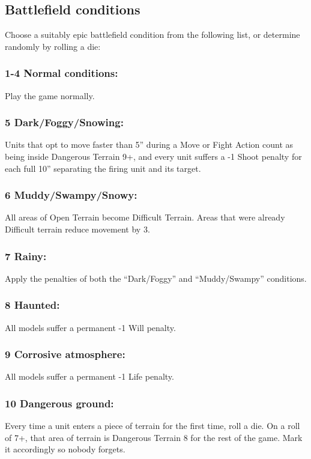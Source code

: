 \begin{multicols}{2}
\section*{Battlefield conditions}
Choose a suitably epic battlefield condition from the following list, or determine randomly by rolling a die:

\subsubsection*{1-4 Normal conditions:} Play the game normally.

\subsubsection*{5 Dark/Foggy/Snowing:} Units that opt to move faster than 5'' during a Move or Fight Action count as being inside Dangerous Terrain 9+, and every unit suffers a -1 Shoot penalty for each full 10'' separating the firing unit and its target.

\subsubsection*{6 Muddy/Swampy/Snowy:} All areas of Open Terrain become Difficult Terrain. Areas that were already Difficult terrain reduce movement by 3.

\subsubsection*{7 Rainy:} Apply the penalties of both the ``Dark/Foggy'' and ``Muddy/Swampy'' conditions.

\subsubsection*{8 Haunted:} All models suffer a permanent -1 Will penalty.

\subsubsection*{9 Corrosive atmosphere:} All models suffer a permanent -1 Life penalty.

\subsubsection*{10 Dangerous ground:} Every time a unit enters a piece of terrain for the first time, roll a die. On a roll of 7+, that area of terrain is Dangerous Terrain 8 for the rest of the game. Mark it accordingly so nobody forgets.





\end{multicols}
